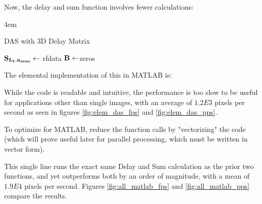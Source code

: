     Now, the delay and sum function involves fewer calculations:

    \begin{algorithm} [H]
        \parindent4em
        \normalem
        \caption{DAS with 3D Delay Matrix}\label{algo:das_3d_indmat}
            $\bf{S}_{L_f,n_{sens}} \gets$ rfdata\;
            $\bf{B} \gets $zeros\;
        \end{algorithm}

    The elemental implementation of this in MATLAB is:

    

    While the code is readable and intuitive, the performance is too slow to be useful for applications other than single images, with an average of $1.2E3$ pixels per second as seen in figures \ref{fig:elem_das_fps} and \ref{fig:elem_das_pps}. 


    To optimize for MATLAB, reduce the function calls by "vectorizing" the code (which will prove useful later for parallel processing, which must be written in vector form).

    

    This single line runs the exact same Delay and Sum calculation as the prior two functions, and yet outperforms both by an order of magnitude, with a mean of $1.9E4$ pixels per second. Figures \ref{fig:all_matlab_fps} and \ref{fig:all_matlab_pps} compare the results.


